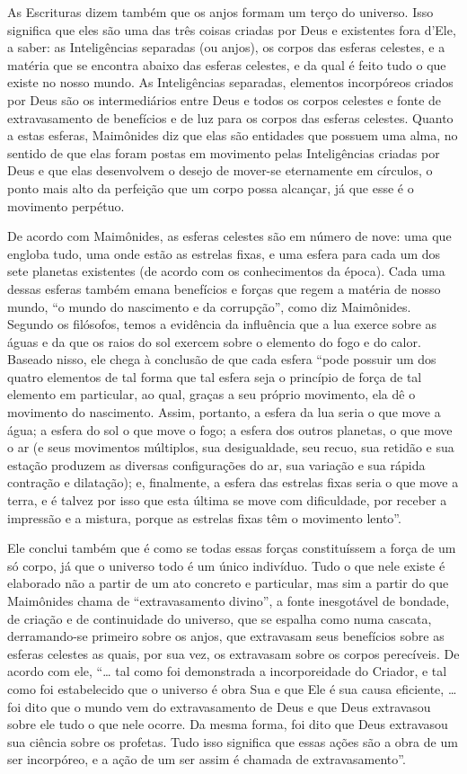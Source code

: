 As Escrituras dizem também que os anjos formam um terço do universo.
Isso significa que eles são uma das três coisas criadas por Deus e
existentes fora d'Ele, a saber: as Inteligências separadas (ou anjos),
os corpos das esferas celestes, e a matéria que se encontra abaixo das
esferas celestes, e da qual é feito tudo o que existe no nosso mundo. As
Inteligências separadas, elementos incorpóreos criados por Deus são os
intermediários entre Deus e todos os corpos celestes e fonte de
extravasamento de benefícios e de luz para os corpos das esferas
celestes. Quanto a estas esferas, Maimônides diz que elas são entidades
que possuem uma alma, no sentido de que elas foram postas em movimento
pelas Inteligências criadas por Deus e que elas desenvolvem o desejo de
mover-se eternamente em círculos, o ponto mais alto da perfeição que um
corpo possa alcançar, já que esse é o movimento perpétuo.

De acordo com Maimônides, as esferas celestes são em número de nove: uma
que engloba tudo, uma onde estão as estrelas fixas, e uma esfera para
cada um dos sete planetas existentes (de acordo com os conhecimentos da
época). Cada uma dessas esferas também emana benefícios e forças que
regem a matéria de nosso mundo, ``o mundo do nascimento e da
corrupção'', como diz Maimônides. Segundo os filósofos, temos a
evidência da influência que a lua exerce sobre as águas e da que os
raios do sol exercem sobre o elemento do fogo e do calor. Baseado
nisso, ele chega à conclusão de que cada esfera ``pode possuir um dos
quatro elementos de tal forma que tal esfera seja o princípio de força
de tal elemento em particular, ao qual, graças a seu próprio movimento,
ela dê o movimento do nascimento. Assim, portanto, a esfera da lua seria
o que move a água; a esfera do sol o que move o fogo; a esfera dos
outros planetas, o que move o ar (e seus movimentos múltiplos, sua
desigualdade, seu recuo, sua retidão e sua estação produzem as diversas
configurações do ar, sua variação e sua rápida contração e dilatação);
e, finalmente, a esfera das estrelas fixas seria o que move a terra, e é
talvez por isso que esta última se move com dificuldade, por receber a
impressão e a mistura, porque as estrelas fixas têm o movimento
lento''.

Ele conclui também que é como se todas essas forças constituíssem a
força de um só corpo, já que o universo todo é um único indivíduo. Tudo
o que nele existe é elaborado não a partir de um ato concreto e
particular, mas sim a partir do que Maimônides chama de ``extravasamento
divino'', a fonte inesgotável de bondade, de criação e de continuidade
do universo, que se espalha como numa cascata, derramando-se primeiro
sobre os anjos, que extravasam seus benefícios sobre as esferas
celestes as quais, por sua vez, os extravasam sobre os corpos
perecíveis. De acordo com ele, ``\ldots{} tal como foi demonstrada a
incorporeidade do Criador, e tal como foi estabelecido que o universo é
obra Sua e que Ele é sua causa eficiente, \ldots{} foi dito que o mundo vem
do extravasamento de Deus e que Deus extravasou sobre ele tudo o que
nele ocorre. Da mesma forma, foi dito que Deus extravasou sua ciência
sobre os profetas. Tudo isso significa que essas ações são a obra de um
ser incorpóreo, e a ação de um ser assim é chamada de extravasamento''.

